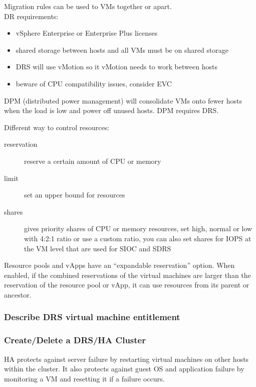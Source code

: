 Migration rules can be used to VMs together or apart.\\

DR requirements:

\begin{itemize}
\item vSphere Enterprise or Enterprise Plus licenses
\item shared storage between hosts and all VMs must be on shared storage
\item DRS will use vMotion so it vMotion needs to work between hosts
\item beware of CPU compatibility issues, consider EVC
\end{itemize}

DPM (distributed power management) will consolidate VMs onto fewer hosts when
the load is low and power off unused hosts. DPM requires DRS.

Different way to control resources:

\begin{description}

\item[reservation]
reserve a certain amount of CPU or memory

\item[limit]
set an upper bound for resources

\item[shares]
gives priority shares of CPU or memory resources, set high, normal or low
with 4:2:1 ratio or use a custom ratio, you can also set shares for IOPS
at the VM level that are used for SIOC and SDRS

\end{description}

Resource pools and vApps have an ``expandable reservation'' option. When
enabled, if the combined reservations of the virtual machines are larger
than the reservation of the resource pool or vApp, it can use resources from
its parent or ancestor.

\subsubsection{Describe DRS virtual machine entitlement}

\subsubsection{Create/Delete a DRS/HA Cluster}

HA protects against server failure by restarting virtual machines on other
hosts within the cluster. It also protects against guest OS and application
failure by monitoring a VM and resetting it if a failure occurs.\\

